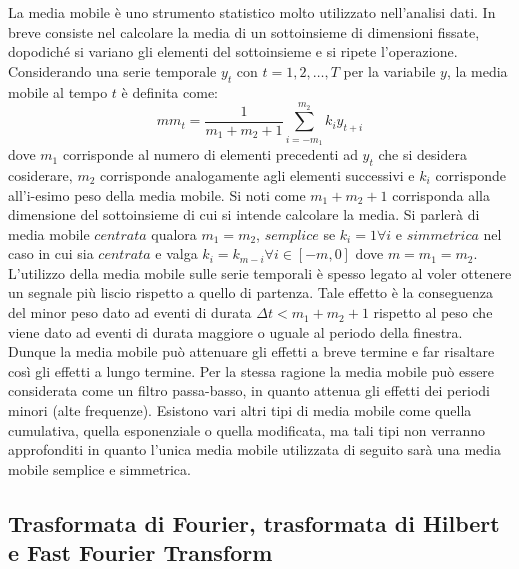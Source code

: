 \documentclass[a4paper, 12pt]{book}
\begin{document}
La media mobile è uno strumento statistico molto utilizzato nell'analisi dati.
In breve consiste nel calcolare la media di un sottoinsieme di dimensioni fissate, dopodiché si variano gli elementi del sottoinsieme e si ripete l'operazione.
Considerando una serie temporale {$y_t$} con $t = 1,2,\ldots,T$ per la variabile $y$, la media mobile al tempo $t$ è definita come:
\begin{equation}
	mm_t = \frac{1}{m_1+m_2+1} \displaystyle \sum_{i=-m_1}^{m_2} k_iy_{t+i}
\end{equation}
dove $m_1$ corrisponde al numero di elementi precedenti ad $y_t$ che si desidera cosiderare, $m_2$ corrisponde analogamente agli elementi successivi e $k_i$ corrisponde all'i-esimo peso della media mobile.
Si noti come $m_1+m_2+1$ corrisponda alla dimensione del sottoinsieme di cui si intende calcolare la media.
Si parlerà di media mobile $centrata$ qualora $m_1=m_2$, $semplice$ se $k_i=1 \forall i$ e $simmetrica$ nel caso in cui sia $centrata$ e valga $k_i=k_{m-i} \forall i \in [-m, 0]$ dove $m=m_1=m_2$.
L'utilizzo della media mobile sulle serie temporali è spesso legato al voler ottenere un segnale più liscio rispetto a quello di partenza.
Tale effetto è la conseguenza del minor peso dato ad eventi di durata $\Delta t < m_1+m_2+1$ rispetto al peso che viene dato ad eventi di durata maggiore o uguale al periodo della finestra.
Dunque la media mobile può attenuare gli effetti a breve termine e far risaltare così gli effetti a lungo termine.
Per la stessa ragione la media mobile può essere considerata come un filtro passa-basso, in quanto attenua gli effetti dei periodi minori (alte frequenze).
Esistono vari altri tipi di media mobile come quella cumulativa, quella esponenziale o quella modificata, ma tali tipi non verranno approfonditi in quanto l'unica media mobile utilizzata di seguito sarà una media mobile semplice e simmetrica.


\subsection{Trasformata di Fourier, trasformata di Hilbert e Fast Fourier Transform}
\end{document}
